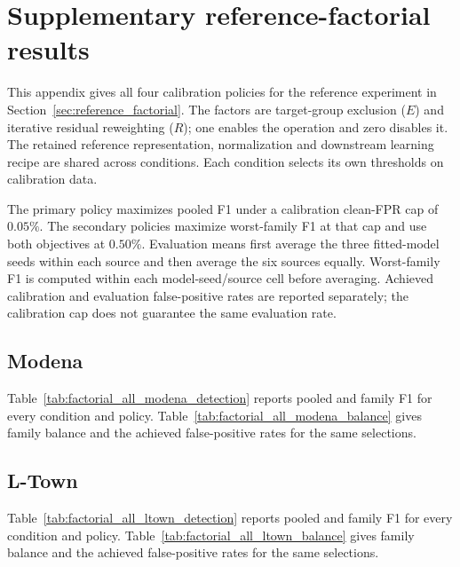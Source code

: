 \chapter{Supplementary reference-factorial results}
\label{app:reference_factorial}

This appendix gives all four calibration policies for the reference experiment in Section~\ref{sec:reference_factorial}. The factors are target-group exclusion ($E$) and iterative residual reweighting ($R$); one enables the operation and zero disables it. The retained reference representation, normalization and downstream learning recipe are shared across conditions. Each condition selects its own thresholds on calibration data.

The primary policy maximizes pooled F1 under a calibration clean-FPR cap of $0.05\%$. The secondary policies maximize worst-family F1 at that cap and use both objectives at $0.50\%$. Evaluation means first average the three fitted-model seeds within each source and then average the six sources equally. Worst-family F1 is computed within each model-seed/source cell before averaging. Achieved calibration and evaluation false-positive rates are reported separately; the calibration cap does not guarantee the same evaluation rate.

\section{Modena}

Table~\ref{tab:factorial_all_modena_detection} reports pooled and family F1 for every condition and policy. Table~\ref{tab:factorial_all_modena_balance} gives family balance and the achieved false-positive rates for the same selections.




\clearpage
\section{L-Town}

Table~\ref{tab:factorial_all_ltown_detection} reports pooled and family F1 for every condition and policy. Table~\ref{tab:factorial_all_ltown_balance} gives family balance and the achieved false-positive rates for the same selections.



